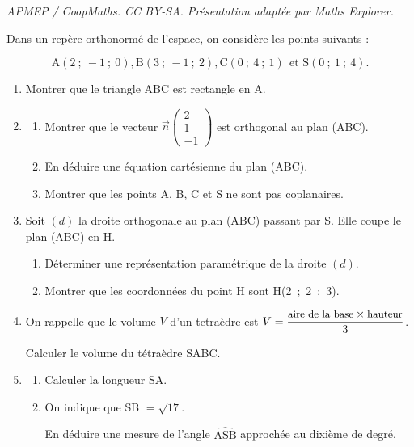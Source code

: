 \documentclass[10pt]{article}
\providecommand{\vect}[1]{\overrightarrow{#1}}
\begin{document}
\noindent\textit{APMEP / CoopMaths. CC BY-SA. Présentation adaptée par Maths Explorer.}\par\medskip
\medskip

Dans un repère orthonormé de l'espace, on considère les points suivants :

\[\text{A}(2~;~-1~;~0), \text{B}(3~;~-1~;~2), \text{C}(0~;~4~;~1) \: \: \text{et S} (0~;~1~;~4).\]

\smallskip

\begin{enumerate}
\item Montrer que le triangle ABC est rectangle en A.
\item  
	\begin{enumerate}
		\item Montrer que le vecteur $\vect{n}\begin{pmatrix}2\\1\\- 1\end{pmatrix}$ est orthogonal au plan (ABC).
		\item En déduire une équation cartésienne du plan (ABC).
		\item Montrer que les points A, B, C et S ne sont pas coplanaires.
	\end{enumerate}
\item  Soit $(d)$ la droite orthogonale au plan (ABC) passant par S. Elle coupe le plan (ABC) en H.
	\begin{enumerate}
		\item Déterminer une représentation paramétrique de la droite $(d)$.
		\item Montrer que les coordonnées du point H sont H(2~;~2~;~3).
	\end{enumerate}
\item  On rappelle que le volume $V$ d'un tetraèdre est $V = \dfrac{\small \text{aire de la base} \times \text{hauteur}}{3}$.

 Calculer le volume du tétraèdre SABC.
\item  
	\begin{enumerate}
		\item Calculer la longueur SA.
		\item On indique que SB $= \sqrt{17}$.

En déduire une mesure de l'angle $\widehat{\text{ASB}}$ approchée au dixième de degré.
	\end{enumerate}
\end{enumerate}

\bigskip
\end{document}
